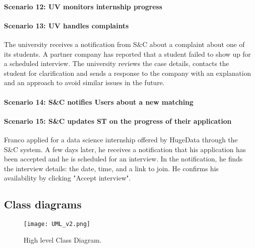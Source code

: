 \paragraph{Scenario 12: UV monitors internship progress}

\paragraph{Scenario 13: UV handles complaints}
The university receives a notification from S\&C about a complaint about one of its students. A partner company has reported that a student failed to show up for a scheduled interview. The university reviews the case details, contacts the student for clarification and sends a response to the company with an explanation and an approach to avoid similar issues in the future.

\paragraph{Scenario 14: S\&C notifies Users about a new matching}

\paragraph{Scenario 15: S\&C updates ST on the progress of their application}
Franco applied for a data science internship offered by HugeData through the S\&C system. A few days later, he receives a notification that his application has been accepted and he is scheduled for an interview. In the notification, he finds the interview details: the date, time, and a link to join. He confirms his availability by clicking "Accept interview".

\newpage

\subsection{Class diagrams}
\label{subsec:class_diagrams}%

\begin{figure}[H]
    \begin{center}
        \texttt{[image: UML\_v2.png]}
        \caption{High level Class Diagram.}
        \label{fig:UML}%
    \end{center}
\end{figure}

